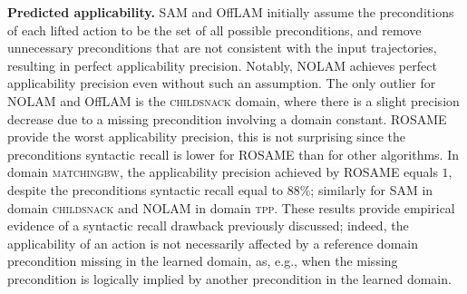 \documentclass[letterpaper]{article} %
\newcommand{\sam}{\ac{SAM}\xspace}
\newcommand{\nolam}{NOLAM\xspace}
\newcommand{\offlam}{OffLAM\xspace}
\newcommand{\rosame}{ROSAME\xspace}
\newcommand{\samshort}{SAM\xspace}
\newcommand{\miniparagraph}[1]{\textbf{#1.}}
\newif\ifaddcomments
\newcommand{\roni}[1]{\ifaddcomments{\textcolor{red}{[Roni: #1]}}\fi}
\newcommand{\argaman}[1]{\ifaddcomments{\textcolor{blue}{[Argaman: #1]}}\fi}
\newcommand{\leo}[1]{\ifaddcomments{\textcolor{pink}{[Leonardo: #1]}}\fi}
\begin{document}



\miniparagraph{Predicted applicability} 
\samshort and \offlam initially assume the preconditions of each lifted action to be the set of all possible preconditions, and remove unnecessary preconditions that are not consistent with the input trajectories, resulting in perfect applicability precision. Notably, \nolam{} achieves perfect applicability precision even without such an assumption.
The only outlier for \nolam{} and \offlam{} is the \textsc{childsnack} domain, where there is a slight precision decrease due to a missing precondition involving a domain constant.
\rosame provide the worst applicability precision, this is not surprising since the preconditions syntactic recall is lower for \rosame than for other algorithms.
%
In domain \textsc{matchingbw}, the applicability precision achieved by \rosame equals $1$, despite the preconditions syntactic recall equal to $88\%$; similarly for \samshort in domain \textsc{childsnack} and \nolam in domain \textsc{tpp}. These results provide empirical evidence of a syntactic recall drawback previously discussed; indeed, the applicability of an action is not necessarily affected by a reference domain precondition missing in the learned domain, as, e.g., when the missing precondition is logically implied by another precondition in the learned domain. 
\end{document}
